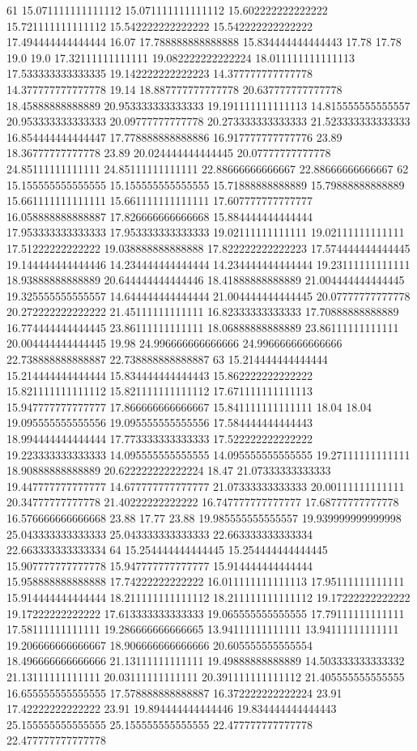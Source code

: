 61 15.071111111111112 15.071111111111112 15.602222222222222 15.721111111111112 15.542222222222222 15.542222222222222 17.494444444444444 16.07 17.788888888888888 15.834444444444443 17.78 17.78 19.0 19.0 17.32111111111111 19.082222222222224 18.011111111111113 17.533333333333335 19.142222222222223 14.377777777777778 14.377777777777778 19.14 18.887777777777778 20.637777777777778 18.45888888888889 20.953333333333333 19.191111111111113 14.815555555555557 20.953333333333333 20.09777777777778 20.273333333333333 21.523333333333333 16.854444444444447 17.778888888888886 16.917777777777776 23.89 18.36777777777778 23.89 20.024444444444445 20.07777777777778 24.85111111111111 24.85111111111111 22.88666666666667 22.88666666666667
62 15.155555555555555 15.155555555555555 15.71888888888889 15.79888888888889 15.661111111111111 15.661111111111111 17.607777777777777 16.058888888888887 17.826666666666668 15.884444444444444 17.953333333333333 17.953333333333333 19.02111111111111 19.02111111111111 17.51222222222222 19.038888888888888 17.822222222222223 17.574444444444445 19.144444444444446 14.234444444444444 14.234444444444444 19.23111111111111 18.93888888888889 20.644444444444446 18.41888888888889 21.004444444444445 19.325555555555557 14.644444444444444 21.004444444444445 20.07777777777778 20.272222222222222 21.45111111111111 16.82333333333333 17.70888888888889 16.774444444444445 23.86111111111111 18.06888888888889 23.86111111111111 20.004444444444445 19.98 24.996666666666666 24.996666666666666 22.738888888888887 22.738888888888887
63 15.214444444444444 15.214444444444444 15.834444444444443 15.862222222222222 15.821111111111112 15.821111111111112 17.671111111111113 15.947777777777777 17.866666666666667 15.841111111111111 18.04 18.04 19.095555555555556 19.095555555555556 17.584444444444443 18.994444444444444 17.773333333333333 17.522222222222222 19.223333333333333 14.095555555555555 14.095555555555555 19.27111111111111 18.90888888888889 20.622222222222224 18.47 21.07333333333333 19.447777777777777 14.677777777777777 21.07333333333333 20.00111111111111 20.34777777777778 21.40222222222222 16.747777777777777 17.68777777777778 16.576666666666668 23.88 17.77 23.88 19.985555555555557 19.939999999999998 25.043333333333333 25.043333333333333 22.663333333333334 22.663333333333334
64 15.254444444444445 15.254444444444445 15.907777777777778 15.947777777777777 15.914444444444444 15.958888888888888 17.74222222222222 16.011111111111113 17.95111111111111 15.914444444444444 18.211111111111112 18.211111111111112 19.17222222222222 19.17222222222222 17.613333333333333 19.065555555555555 17.79111111111111 17.58111111111111 19.286666666666665 13.94111111111111 13.94111111111111 19.206666666666667 18.906666666666666 20.605555555555554 18.496666666666666 21.13111111111111 19.49888888888889 14.503333333333332 21.13111111111111 20.03111111111111 20.391111111111112 21.405555555555555 16.655555555555555 17.578888888888887 16.372222222222224 23.91 17.42222222222222 23.91 19.894444444444446 19.834444444444443 25.155555555555555 25.155555555555555 22.477777777777778 22.477777777777778
